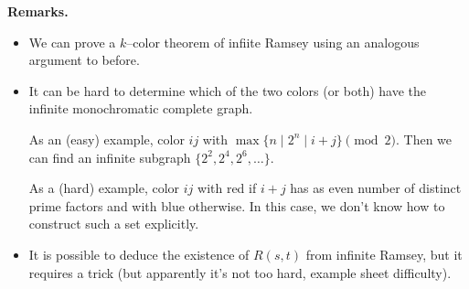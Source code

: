 \documentclass{article}
\theoremstyle{definition}
\begin{document}

\textbf{Remarks.} 
\begin{itemize}
    \item We can prove a $k$--color theorem of infiite Ramsey using an analogous argument to before.
    \item It can be hard to determine which of the two colors (or both) have the infinite monochromatic complete graph. 
    
    As an (easy) example, color $ij$ with $\max \{n \mid 2^n \mid i+j\}\pmod{2}$. Then we can find an infinite subgraph $\{2^2,2^4,2^6,\ldots\}$.

    As a (hard) example, color $ij$ with red if $i+j$ has as even number of distinct prime factors and with blue otherwise. In this case, we don't know how to construct such a set explicitly. 
    \item It is possible to deduce the existence of $R(s,t)$ from infinite Ramsey, but it requires a trick (but apparently it's not too hard, example sheet difficulty).
\end{itemize} 
\end{document}
